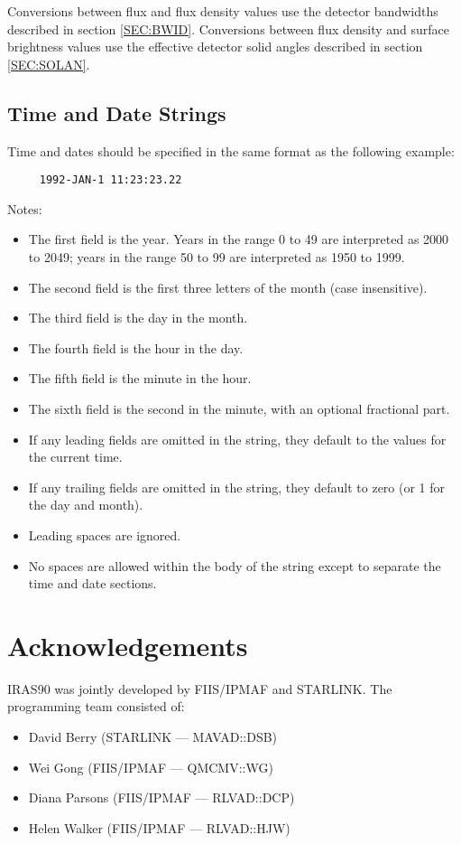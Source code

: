 Conversions between flux and flux density  values use the detector bandwidths
described in section \ref{SEC:BWID}. Conversions between flux density and
surface brightness  values use the effective detector solid angles described in
section \ref{SEC:SOLAN}. 

\subsection{Time and Date Strings}
\label{SEC:TIM}
Time and dates should be specified in the same format as the
following example: 

\small
\begin{verbatim}
     1992-JAN-1 11:23:23.22
\end{verbatim}
\normalsize

Notes: 
\begin{itemize}
\item The first field is the year. Years in the range 0 to 49 
     are interpreted as 2000 to 2049; years in the range 50 
     to 99 are interpreted as 1950 to 1999. 
\item The second field is the first three letters of the month 
     (case insensitive).
\item The third field is the day in the month.
\item The fourth field is the hour in the day.
\item The fifth field is the minute in the hour.
\item The sixth field is the second in the minute, with an 
     optional fractional part.
\item If any leading fields are omitted in the string, they 
     default to the values for the current time.
\item If any trailing fields are omitted in the string, they 
     default to zero (or 1 for the day and month).
\item Leading spaces are ignored.
\item No spaces are allowed within the body of the string except 
     to separate the time and date sections.
\end{itemize}

\section{Acknowledgements}
{\small IRAS90} was jointly developed by {\small FIIS/IPMAF} and 
{\small STARLINK}. The programming team consisted of:
\begin{itemize}
\item David Berry (STARLINK --- MAVAD::DSB)
\item Wei Gong (FIIS/IPMAF --- QMCMV::WG)
\item Diana Parsons (FIIS/IPMAF --- RLVAD::DCP)
\item Helen Walker (FIIS/IPMAF --- RLVAD::HJW)
\end{itemize}

